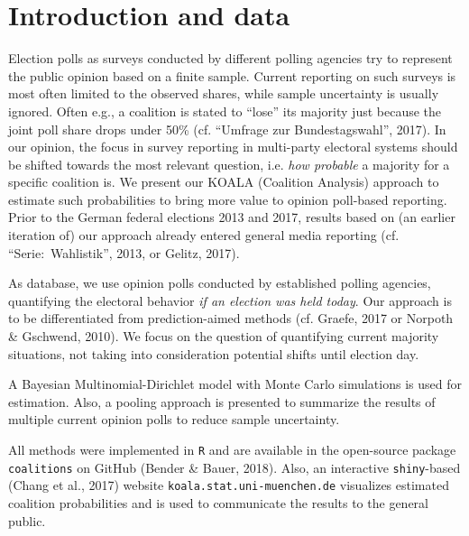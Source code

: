 \documentclass[twoside]{report}
\begin{document}


\section{Introduction and data}
Election polls as surveys conducted by different polling agencies try to represent the public opinion based on a finite sample. Current reporting on such surveys is most often limited to the observed shares, while sample uncertainty is usually ignored. Often e.g., a coalition is stated to ``lose'' its majority just because the joint poll share drops under 50\% (cf. ``Umfrage zur Bundestagswahl'', 2017).
In our opinion, the focus in survey reporting in multi-party electoral systems should be shifted towards the most relevant question, i.e. \textit{how probable} a majority for a specific coalition is.
We present our KOALA (Coalition Analysis) approach to estimate such probabilities
to bring more value to opinion poll-based reporting.
Prior to the German federal elections 2013 and 2017, results based on (an earlier iteration of) our approach already entered general media reporting (cf. ``Serie:~Wahlistik'', 2013, or Gelitz, 2017).

As database, we use opinion polls conducted by established polling agencies,
quantifying the electoral behavior \textit{if an election was held today}.
Our approach is to be differentiated from prediction-aimed methods (cf. Graefe, 2017 or Norpoth \& Gschwend, 2010). We focus on the question of quantifying current majority situations, not taking into consideration potential shifts until election
day.

A Bayesian Multinomial-Dirichlet model with Monte Carlo simulations is used for estimation. Also, a pooling approach is presented to summarize the results of multiple current opinion polls to reduce sample uncertainty.

All methods were implemented in \texttt{R} and are available in the open-source
package \texttt{coalitions} on GitHub (Bender \& Bauer, 2018). Also, an
interactive \texttt{shiny}-based (Chang et al., 2017) website \texttt{koala.stat.uni-\allowbreak muenchen.\allowbreak de}
visualizes estimated coalition probabilities and is used to communicate the
results to the general public.
\end{document}
